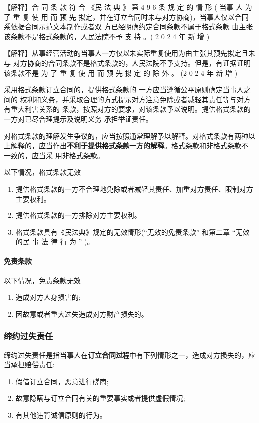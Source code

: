 \documentclass[UTF8,12pt]{ctexart}
\numberwithin{equation}{section} %
\numberwithin{figure}{section}
\numberwithin{table}{section}
\begin{document}
	【解释】合 同 条 款 符 合 《民 法 典 》 第 4 9 6 条 规 定 的 情 形 ( 当事 人 为 了 重 复 使 用 而 预 先 拟定，并在订立合同时未与对方协商)，当事人仅以合同系依据合同示范文本制作或者双 方已经明确约定合同条款不属于格式条款 由主张该条款不是格式条款的，人民法院不予 支 持 。( 2 0 2 4 年 新 增 )
	
	【解释】从事经营活动的当事人一方仅以未实际重复使用为由主张其预先拟定且未与 对方协商的合同条款不是格式条款的，人民法院不予支持。但是，有证据证明该条款不是 为 了 重 复 使 用 而 预 先 拟 定 的 除 外 。 (2 0 2 4 年 新 增 )
	
	
	采用格式条款订立合同的，提供格式条款的 一方应当遵循公平原则确定当事人之间的 权利和义务，并采取合理的方式提示对方注意免除或者减轻其责任等与对方有重大利害关系的 条款，按照对方的要求，对该条款予以说明。提供格式条款的 一方对已尽合理提示及说明义务 承担举证责任。
	
	对格式条款的理解发生争议的，应当按照通常理解予以解释。对格式条款有两种以上解释的，应当作出\textbf{不利于提供格式条款一方的解释}。格式条款和非格式条款不 一致的，应当采 用非格式条款。
	
	以下情况，格式条款无效
	\begin{enumerate}
		\item 提供格式条款的一方不合理地免除或者减轻其责任、加重对方责任、限制对方主要权利。 
		
		\item 提供格式条款的一方排除对方主要权利。 
		
		\item 格式条款具有《民法典》规定的无效情形(“无效的免责条款” 和第二章 “无效的民 事 法 律 行 为 ” )。
	\end{enumerate}
	
	
	\paragraph{免责条款}
	以下情况，免责条款无效
	\begin{enumerate}
		\item 造成对方人身损害的;
		
		\item 因故意或者重大过失造成对方财产损失的。
	\end{enumerate}
	
	\subsubsection{缔约过失责任}
	缔约过失责任是指当事人在\textbf{订立合同过程}中有下列情形之一，造成对方损失的，应当承担赔偿责任: 
	\begin{enumerate}
		\item 假借订立合同，恶意进行磋商;
		
		\item 故意隐瞒与订立合同有关的重要事实或者提供虚假情况; 
		
		\item 有其他违背诚信原则的行为。
	\end{enumerate}
	
\end{document}
